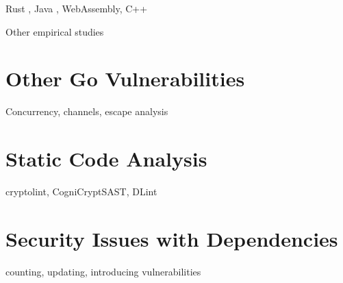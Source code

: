 Rust \cite{evans2020, qin2020}, Java \cite{huang2019, mastrangelo2015, wickert2019}, WebAssembly, C++ \cite{alnaeli2017, larochelle2001}

Other empirical studies \cite{difranco2017, lu2013, chou2001, leesatapornwongsa2016, lauinger2017, jin2012, gunawi2014, gu2015}



\section{Other Go Vulnerabilities}\label{sec:related-work:other-go-vulnerabilities}

Concurrency, channels, escape analysis \cite{wang2020, sibiryov2017, tu2019, giunti2020, lange2017, zhou2017, dilley2019, hill2002, hannan1998, choi1999}



\section{Static Code Analysis}\label{sec:related-work:static-code-analysis}

cryptolint, CogniCryptSAST, DLint \cite{egele2013, kruger2018, gong2015, smith2020, gabet2020}



\section{Security Issues with Dependencies}\label{sec:related-work:dependency-issues}

counting, updating, introducing vulnerabilities \cite{xia2014, mirhosseini2017, kula2017, watanabe2017, pashchenko2018}


